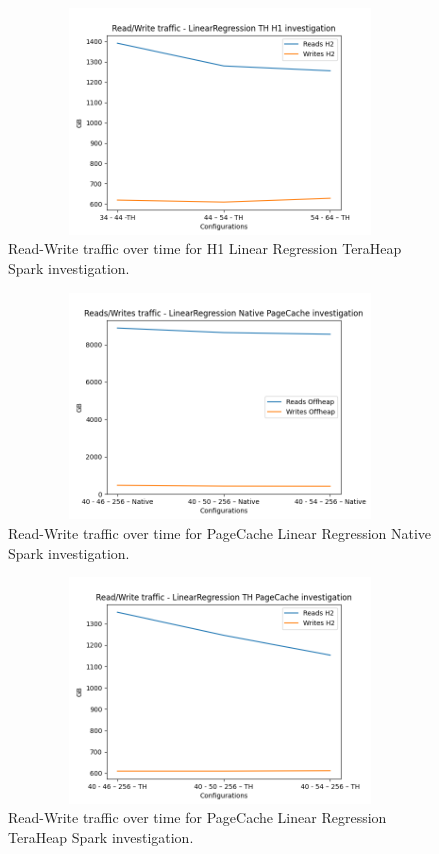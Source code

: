 \begin{figure}[ht!]
    \includegraphics[width=12cm,height=6cm]{./fig/rw_linr_h1_th.png}
    \caption{Read-Write traffic over time for H1 Linear Regression
    TeraHeap Spark investigation.}
    \label{fig:rw_linr_h1_th}
\end{figure}

\begin{figure}[ht!]
    \includegraphics[width=12cm,height=6cm]{./fig/rw_linr_pc_native.png}
    \caption{Read-Write traffic over time for PageCache Linear
    Regression Native Spark investigation.}
    \label{fig:rw_linr_pc_native}
\end{figure}

\begin{figure}[ht!]
    \includegraphics[width=12cm,height=6cm]{./fig/rw_linr_pc_th.png}
    \caption{Read-Write traffic over time for PageCache Linear
    Regression TeraHeap Spark investigation.}
    \label{fig:rw_linr_pc_th}
\end{figure}

